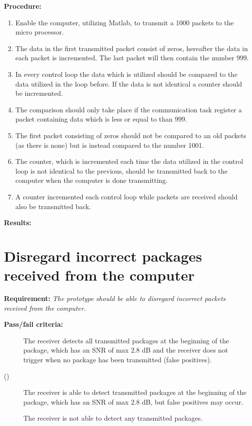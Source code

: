 		
\textbf{Procedure:}\\

\begin{enumerate}
	\item Enable the computer, utilizing Matlab, to transmit a 1000 packets to the micro processor.
	\item The data in the first transmitted packet consist of zeros, hereafter the data in each packet is incremented. The last packet will then contain the number 999. 
	\item In every control loop the data which is utilized should be compared to the data utilized in the loop before. If the data is not identical a counter should be incremented. 
	\item The comparison should only take place if the communication task register a packet containing data which is less or equal to than 999.
	\item The first packet consisting of zeros should not be compared to an old packets (as there is none) but is instead compared to the number 1001. 
	\item The counter, which is incremented each time the data utilized in the control loop is not identical to the previous, should be transmitted back to the computer when the computer is done transmitting.
	\item A counter incremented each control loop while packets are received should also be transmitted back.
\end{enumerate} 

\textbf{Results:}

\newpage

\section{Disregard incorrect packages received from the computer}
\textbf{Requirement:}
\textit{The prototype should be able to disregard incorrect packets received from the computer.}

\textbf{Pass/fail criteria:}
	\begin{description}
	\item[  ] The receiver detects all transmitted packages at the beginning of the package, which has an SNR of max 2.8 dB and the receiver does not trigger when no package has been transmitted (false positives).
	\item[()]The receiver is able to detect transmitted packages at the beginning of the package, which has an SNR of max 2.8 dB, but false positives may occur.
	\item[  \phantom{)}]The receiver is not able to detect any transmitted packages.
	\end{description}

